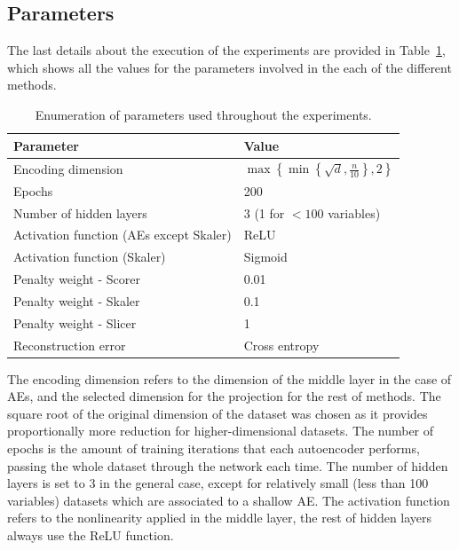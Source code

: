 \subsection{Parameters}

The last details about the execution of the experiments are provided in Table~\ref{p6tbl.params}, which shows all the values for the parameters involved in the each of the different methods.

\begin{table}[ht]
  \centering
  \caption{\label{p6tbl.params}Enumeration of parameters used throughout the experiments.}
  \begin{tabular}{ll}
    \toprule
    Parameter                               & Value                                                            \\
    \midrule
    Encoding dimension                      & $\max\left\{\min\left\{\sqrt d, \frac{n}{10}\right\}, 2\right\}$ \\
    Epochs                                  & 200                                                              \\
    Number of hidden layers                 & 3 (1 for $<100$ variables)                                       \\
    Activation function (AEs except Skaler) & ReLU                                                             \\
    Activation function (Skaler)            & Sigmoid                                                          \\
    Penalty weight - Scorer                 & 0.01                                                             \\
    Penalty weight - Skaler                 & 0.1                                                              \\
    Penalty weight - Slicer                 & 1                                                                \\
    Reconstruction error                    & Cross entropy                                                    \\
    \bottomrule
  \end{tabular}
\end{table}

\iffalse The encoding dimension refers to the dimension of the middle layer in the case of AEs, and the selected dimension for the projection for the rest of methods. The square root of the original dimension of the dataset was chosen as it provides proportionally more reduction for higher-dimensional datasets.
  The number of epochs is the amount of training iterations that each autoencoder performs, passing the whole dataset through the network each time. The number of hidden layers is set to 3 in the general case, except for relatively small (less than 100 variables) datasets which are associated to a shallow AE. The activation function refers to the nonlinearity applied in the middle layer, the rest of hidden layers always use the ReLU function.


